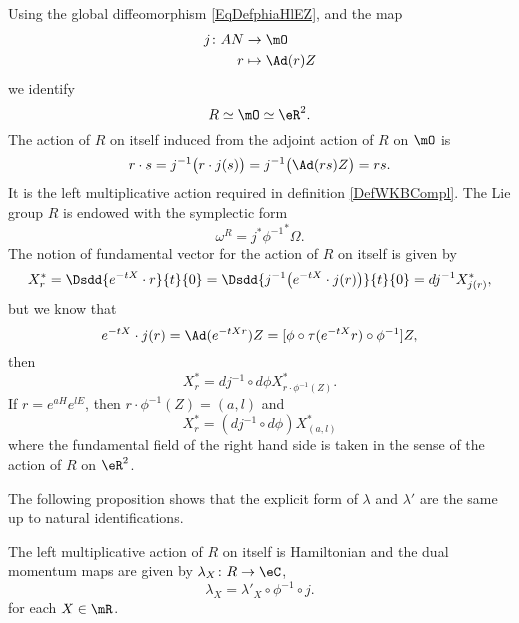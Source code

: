 Using the global diffeomorphism \eqref{EqDefphiaHlEZ}, and the map 
\begin{equation}
\begin{aligned}
 j\colon AN&\to \mO \\ 
r&\mapsto \Ad(r)Z 
\end{aligned}
\end{equation}
we identify
\[
   R\simeq\mO\simeq\eR^2.
\]
The action of $R$ on itself induced from the adjoint action of $R$ on $\mO$ is 
\[ 
  r\cdot s=j^{-1}\big( r\cdot j(s) \big)=j^{-1}\big( \Ad(rs)Z \big)=rs.
\]
It is the left multiplicative action required in definition \ref{DefWKBCompl}. The Lie group $R$ is endowed with the symplectic form 
\[ 
\omega^R=j^*{\phi^{-1}}^*\Omega.
\]
The notion of fundamental vector for the action of $R$ on itself is given by
\begin{equation}
  X^*_r=\Dsdd{e^{-tX}\cdot r}{t}{0} 
		=\Dsdd{ j^{-1}\big( e^{-tX}\cdot j(r) \big) }{t}{0}
		=dj^{-1} X^*_{j(r)},
\end{equation}
but we know that 
\[ 
  e^{-tX}\cdot j(r)=\Ad(e^{-tX r})Z=[\phi\circ \tau(e^{-tX}r)\circ \phi^{-1}]Z,
\]
 then
\[
X^*_r=dj^{-1}\circ d\phi X^*_{r\cdot \phi^{-1}(Z)}.
\]
If $r=e^{aH}e^{lE}$, then $r\cdot \phi^{-1}(Z)=(a,l)$ and
\begin{equation}
   X^*_r=(dj^{-1}\circ d\phi) X^*_{(a,l)}
\end{equation}
where the fundamental field of the right hand side is taken in the sense of the action of $R$ on $\eR^2$. 

The following proposition shows that the explicit form of $\lambda$ and $\lambda'$ are the same up to natural identifications.

\begin{proposition}  
The left multiplicative action of $R$ on itself is Hamiltonian and the dual momentum maps are given by  $\lambda_X\colon R\to \eC$,
\begin{equation}
\lambda_X= \lambda'_X\circ\phi^{-1}\circ j.
\end{equation}
for each $X\in\mR$.
\label{PropMomslR}
\end{proposition}

